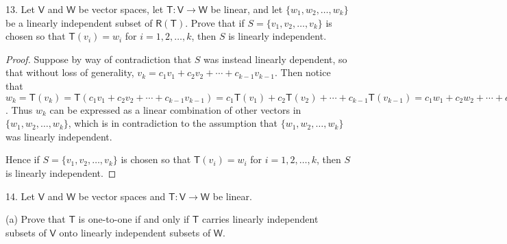 \documentclass[11pt]{article}
\newcommand{\cbr}[1]{\{#1\}}
\begin{document}
13. Let $\mathsf{V}$ and $\mathsf{W}$ be vector spaces, let $\mathsf{T} : \mathsf{V} \to \mathsf{W}$ be linear, and let $\cbr{w_1,w_2,\dots,w_k}$ be a linearly independent subset of $\mathsf{R(T)}$. Prove that if $S = \cbr{v_1,v_2,\dots,v_k}$ is chosen so that $\mathsf{T}(v_i) = w_i$ for $i = 1,2,\dots,k$, then $S$ is linearly independent.

\begin{proof}
    Suppose by way of contradiction that $S$ was instead linearly dependent, so that without loss of generality, $v_k = c_1v_1 + c_2v_2 + \cdots + c_{k-1}v_{k-1}$. Then notice that $w_k = \mathsf{T}(v_k) = \mathsf{T}(c_1v_1 + c_2v_2 + \cdots + c_{k-1}v_{k-1}) = c_1\mathsf{T}(v_1) + c_2\mathsf{T}(v_2) + \cdots + c_{k-1}\mathsf{T}(v_{k-1}) = c_1w_1 + c_2w_2 + \cdots + c_{k-1}w_{k-1}$. Thus $w_k$ can be expressed as a linear combination of other vectors in $\cbr{w_1,w_2,\dots,w_k}$, which is in contradiction to the assumption that $\cbr{w_1,w_2,\dots,w_k}$ was linearly independent. 
    
    Hence if $S = \cbr{v_1,v_2,\dots,v_k}$ is chosen so that $\mathsf{T}(v_i) = w_i$ for $i = 1,2,\dots,k$, then $S$ is linearly independent.
\end{proof}

14. Let $\mathsf{V}$ and $\mathsf{W}$ be vector spaces and $\mathsf{T} : \mathsf{V} \to \mathsf{W}$ be linear.

(a) Prove that $\mathsf{T}$ is one-to-one if and only if $\mathsf{T}$ carries linearly independent subsets of $\mathsf{V}$ onto linearly independent subsets of $\mathsf{W}$.
\end{document}
